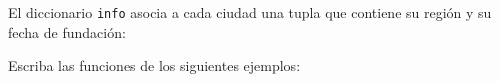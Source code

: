 El diccionario \verb!info! asocia a cada ciudad
una tupla que contiene su región y su fecha de fundación:



Escriba las funciones de los siguientes ejemplos:


